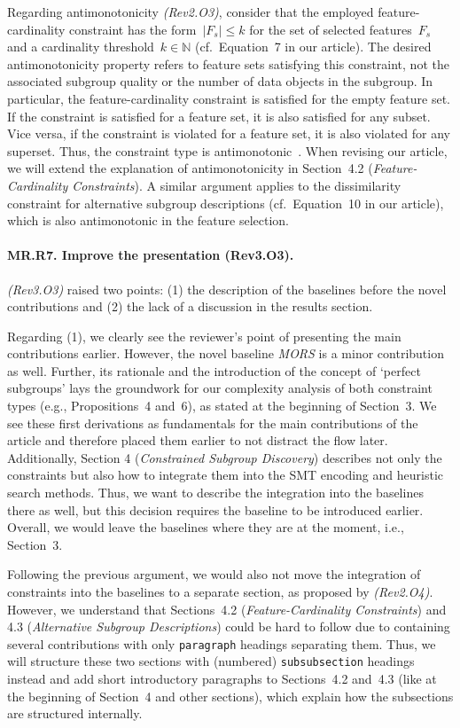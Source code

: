 \documentclass{article}
\begin{document}
Regarding antimonotonicity \emph{(Rev2.O3)}, consider that the employed feature-cardinality constraint has the form~$|F_s| \leq k$ for the set of selected features~$F_s$ and a cardinality threshold~$k \in  \mathbb{N}$ (cf.~Equation~7 in our article).
The desired antimonotonicity property refers to feature sets satisfying this constraint, not the associated subgroup quality or the number of data objects in the subgroup.
In particular, the feature-cardinality constraint is satisfied for the empty feature set.
If the constraint is satisfied for a feature set, it is also satisfied for any subset.
Vice versa, if the constraint is violated for a feature set, it is also violated for any superset.
Thus, the constraint type is antimonotonic~\cite{ng1998exploratory}.
When revising our article, we will extend the explanation of antimonotonicity in Section~4.2 (\emph{Feature-Cardinality Constraints}).
A similar argument applies to the dissimilarity constraint for alternative subgroup descriptions (cf.~Equation~10 in our article), which is also antimonotonic in the feature selection.

\paragraph{MR.R7. Improve the presentation (Rev3.O3).}

\emph{(Rev3.O3)} raised two points:
(1) the description of the baselines before the novel contributions and (2) the lack of a discussion in the results section.

Regarding (1), we clearly see the reviewer's point of presenting the main contributions earlier.
However, the novel baseline \emph{MORS} is a minor contribution as well.
Further, its rationale and the introduction of the concept of `perfect subgroups' lays the groundwork for our complexity analysis of both constraint types (e.g., Propositions~4 and~6), as stated at the beginning of Section~3.
We see these first derivations as fundamentals for the main contributions of the article and therefore placed them earlier to not distract the flow later.
Additionally, Section 4 (\emph{Constrained Subgroup Discovery}) describes not only the constraints but also how to integrate them into the SMT encoding and heuristic search methods.
Thus, we want to describe the integration into the baselines there as well, but this decision requires the baseline to be introduced earlier.
Overall, we would leave the baselines where they are at the moment, i.e., Section~3.

Following the previous argument, we would also not move the integration of constraints into the baselines to a separate section, as proposed by \emph{(Rev2.O4)}.
However, we understand that Sections~4.2 (\emph{Feature-Cardinality Constraints}) and 4.3 (\emph{Alternative Subgroup Descriptions}) could be hard to follow due to containing several contributions with only \texttt{paragraph} headings separating them.
Thus, we will structure these two sections with (numbered) \texttt{subsubsection} headings instead and add short introductory paragraphs to Sections~4.2 and~4.3 (like at the beginning of Section~4 and other sections), which explain how the subsections are structured internally.
\end{document}
